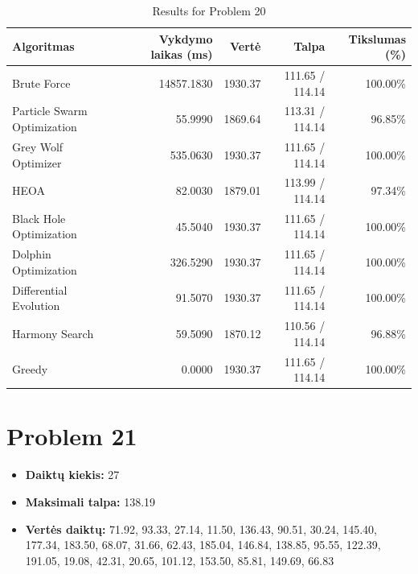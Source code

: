 \documentclass[a4paper,11pt]{article}
\begin{document}
\begin{table}[h!]
\centering
\begin{tabular}{lrrrr}
\toprule
\textbf{Algoritmas} & \textbf{Vykdymo laikas (ms)} & \textbf{Vertė} & \textbf{Talpa} & \textbf{Tikslumas (\%)} \\
\midrule
Brute Force & 14857.1830 & 1930.37 & 111.65 / 114.14 & 100.00\% \\
Particle Swarm Optimization & 55.9990 & 1869.64 & 113.31 / 114.14 & 96.85\% \\
Grey Wolf Optimizer & 535.0630 & 1930.37 & 111.65 / 114.14 & 100.00\% \\
HEOA & 82.0030 & 1879.01 & 113.99 / 114.14 & 97.34\% \\
Black Hole Optimization & 45.5040 & 1930.37 & 111.65 / 114.14 & 100.00\% \\
Dolphin Optimization & 326.5290 & 1930.37 & 111.65 / 114.14 & 100.00\% \\
Differential Evolution & 91.5070 & 1930.37 & 111.65 / 114.14 & 100.00\% \\
Harmony Search & 59.5090 & 1870.12 & 110.56 / 114.14 & 96.88\% \\
Greedy & 0.0000 & 1930.37 & 111.65 / 114.14 & 100.00\% \\
\bottomrule
\end{tabular}
\caption{Results for Problem 20}
\end{table}
\clearpage

\section*{Problem 21}
\begin{itemize}
    \item \textbf{Daiktų kiekis:} 27
    \item \textbf{Maksimali talpa:} 138.19
    \item \textbf{Vertės daiktų:} 71.92, 93.33, 27.14, 11.50, 136.43, 90.51, 30.24, 145.40, 177.34, 183.50, 68.07, 31.66, 62.43, 185.04, 146.84, 138.85, 95.55, 122.39, 191.05, 19.08, 42.31, 20.65, 101.12, 153.50, 85.81, 149.69, 66.83
\end{itemize}
\end{document}
